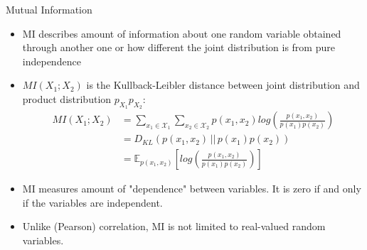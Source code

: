 \documentclass[11pt,compress,t,notes=noshow, aspectratio=169, xcolor=table]{beamer}
\begin{document}
\begin{frame}{Mutual Information}
    \begin{itemize}
        \item MI describes amount of information about one random variable obtained through another one or how different the joint distribution is from pure independence
        \item $MI(X_1 ; X_2 )$ is the Kullback-Leibler distance between joint distribution and product distribution $p_{X_1} p_{X_2}$:
        \begin{align*}
            MI(X_1 ; X_2 ) &= \sum_{x_1 \in \mathcal{X}_1} \sum_{x_2 \in \mathcal{X}_2} p(x_1, x_2) log\left(\frac{p(x_1, x_2)}{p(x_1) p(x_2)} \right) \\
            &= D_{KL} \left( p(x_1, x_2) \, || \, p(x_1) p(x_2) \right) \\
            &= \mathbb{E}_{p(x_1, x_2)} \left[ log\left(\frac{p(x_1, x_2)}{p(x_1) p(x_2)} \right) \right]
        \end{align*}
        \item MI measures amount of "dependence" between variables. It is zero if and only if the variables are independent.
        \item Unlike (Pearson) correlation, MI is not limited to real-valued random variables.
    \end{itemize}
\end{frame}
\end{document}
